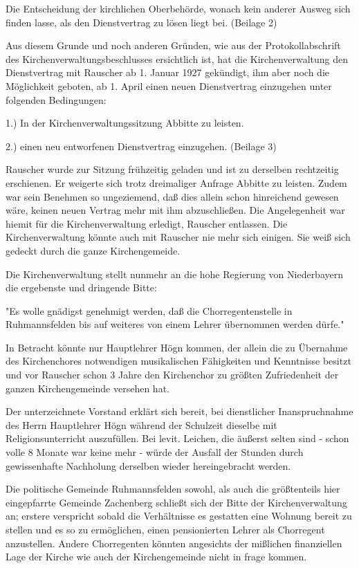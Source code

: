 Die Entscheidung der kirchlichen Oberbehörde, wonach kein anderer Ausweg sich
finden lasse, als den Dienstvertrag zu lösen liegt bei. (Beilage 2)

Aus diesem Grunde und noch anderen Gründen, wie aus der Protokollabschrift des
Kirchenverwaltungsbeschlusses ersichtlich ist, hat die Kirchenverwaltung den
Dienstvertrag mit Rauscher ab 1. Januar 1927 gekündigt, ihm aber noch die
Möglichkeit geboten, ab 1. April einen neuen Dienstvertrag einzugehen unter
folgenden Bedingungen:

    1.) In der Kirchenverwaltungssitzung Abbitte zu leisten.

    2.) einen neu entworfenen Dienstvertrag einzugehen. (Beilage 3)

Rauscher wurde zur Sitzung frühzeitig geladen und ist zu derselben rechtzeitig
erschienen. Er weigerte sich trotz dreimaliger Anfrage Abbitte zu leisten. Zudem
war sein Benehmen so ungeziemend, daß dies allein schon hinreichend gewesen
wäre, keinen neuen Vertrag mehr mit ihm abzuschließen. Die Angelegenheit war
hiemit für die Kirchenverwaltung erledigt, Rauscher entlassen. Die
Kirchenverwaltung könnte auch mit Rauscher nie mehr sich einigen. Sie weiß sich
gedeckt durch die ganze Kirchengemeide.

Die Kirchenverwaltung stellt nunmehr an die hohe Regierung von Niederbayern die
ergebenste und dringende Bitte:

"Es wolle gnädigst genehmigt werden, daß die Chorregentenstelle in
Ruhmannsfelden bis auf weiteres von einem Lehrer übernommen werden dürfe."

In Betracht könnte nur Hauptlehrer Högn kommen, der allein die zu Übernahme des
Kirchenchores notwendigen musikalischen Fähigkeiten und Kenntnisse besitzt und
vor Rauscher schon 3 Jahre den Kirchenchor zu größten Zufriedenheit der ganzen
Kirchengemeinde versehen hat.

Der unterzeichnete Vorstand erklärt sich bereit, bei dienstlicher
Inanspruchnahme des Herrn Hauptlehrer Högn während der Schulzeit dieselbe mit
Religionsunterricht auszufüllen. Bei levit. Leichen, die äußerst selten sind -
schon volle 8 Monate war keine mehr - würde der Ausfall der Stunden durch
gewissenhafte Nachholung derselben wieder hereingebracht werden.

Die politische Gemeinde Ruhmannsfelden sowohl, als auch die größtenteils hier
eingepfarrte Gemeinde Zachenberg schließt sich der Bitte der Kirchenverwaltung
an; erstere verspricht sobald die Verhältnisse es gestatten eine Wohnung bereit
zu stellen und es so zu ermöglichen, einen pensionierten Lehrer als Chorregent
anzustellen. Andere Chorregenten könnten angesichts der mißlichen finanziellen
Lage der Kirche wie auch der Kirchengemeinde nicht in frage kommen.

